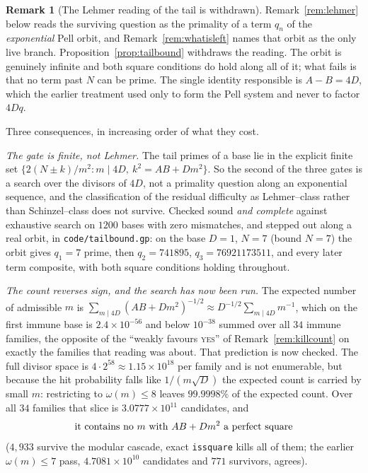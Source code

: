 \documentclass[11pt]{article}
\theoremstyle{definition}
\newtheorem{remark}[theorem]{Remark}
\begin{document}
\begin{remark}[The Lehmer reading of the tail is withdrawn]\label{rem:notlehmer}
Remark~\ref{rem:lehmer} below reads the surviving question as the primality of a term $q_n$ of the
\emph{exponential} Pell orbit, and Remark~\ref{rem:whatisleft} names that orbit as the only live
branch. Proposition~\ref{prop:tailbound} withdraws the reading. The orbit is genuinely infinite and
both square conditions do hold along all of it; what fails is that no term past $N$ can be prime.
The single identity responsible is $A-B=4D$, which the earlier treatment used only to form the Pell
system and never to factor $4Dq$.

Three consequences, in increasing order of what they cost.

\emph{The gate is finite, not Lehmer.} The tail primes of a base lie in the explicit finite set
$\{2(N\pm k)/m^2: m\mid 4D,\ k^2=AB+Dm^2\}$. So the second of the three gates is a search over the
divisors of $4D$, not a primality question along an exponential sequence, and the classification of
the residual difficulty as Lehmer--class rather than Schinzel--class does not survive. Checked sound
\emph{and complete} against exhaustive search on $1200$ bases with zero mismatches, and stepped out
along a real orbit, in \texttt{code/tailbound.gp}: on the base $D=1$, $N=7$ (bound $N=7$) the orbit
gives $q_1=7$ prime, then $q_2=741895$, $q_3=76921173511$, and every later term composite, with both
square conditions holding throughout.

\emph{The count reverses sign, and the search has now been run.} The expected number of admissible
$m$ is $\sum_{m\mid 4D}(AB+Dm^2)^{-1/2}\approx D^{-1/2}\sum_{m\mid4D}m^{-1}$, which on the first
immune base is $2.4\times10^{-56}$ and below $10^{-38}$ summed over all $34$ immune families, the
opposite of the ``weakly favours \textsc{yes}'' of Remark~\ref{rem:killcount} on exactly the families
that reading was about. That prediction is now checked. The full divisor space is
$4\cdot2^{58}\approx1.15\times10^{18}$ per family and is not enumerable, but because the hit
probability falls like $1/(m\sqrt D)$ the expected count is carried by small $m$: restricting to
$\omega(m)\le8$ leaves $99.9998\%$ of the expected count. Over all $34$ families that slice is
$3.0777\times10^{11}$ candidates, and
\[ \textup{it contains no }m\textup{ with }AB+Dm^2\textup{ a perfect square} \]
($4{,}933$ survive the modular cascade, exact \texttt{issquare} kills all of them; the earlier
$\omega(m)\le7$ pass, $4.7081\times10^{10}$ candidates and $771$ survivors, agrees).


\end{remark}
\end{document}
